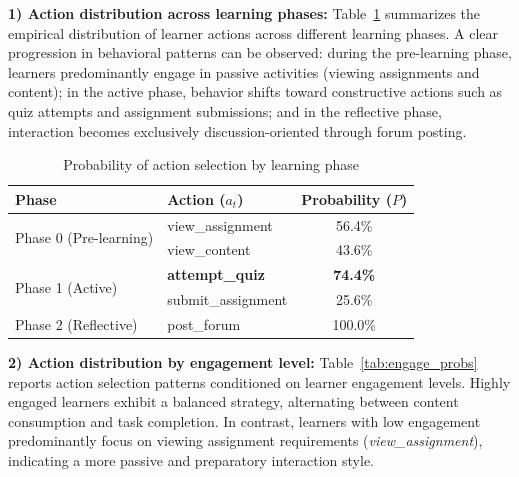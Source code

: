 \documentclass[conference]{IEEEtran}
\begin{document}
\textbf{1) Action distribution across learning phases:}
Table~\ref{tab:phase_probs} summarizes the empirical distribution of learner actions across different learning phases. A clear progression in behavioral patterns can be observed: during the pre-learning phase, learners predominantly engage in passive activities (viewing assignments and content); in the active phase, behavior shifts toward constructive actions such as quiz attempts and assignment submissions; and in the reflective phase, interaction becomes exclusively discussion-oriented through forum posting.

\begin{table}[t]
\caption{Probability of action selection by learning phase}
\label{tab:phase_probs}
\begin{center}
\begin{tabular}{llc}
\toprule
\textbf{Phase} & \textbf{Action ($a_t$)} & \textbf{Probability ($P$)} \\
\midrule
\multirow{2}{*}{Phase 0 (Pre-learning)} & view\_assignment & 56.4\% \\ 
& view\_content & 43.6\% \\
\midrule
\multirow{2}{*}{Phase 1 (Active)} & \textbf{attempt\_quiz} & \textbf{74.4\%} \\ 
& submit\_assignment & 25.6\% \\
\midrule
Phase 2 (Reflective) & post\_forum & 100.0\% \\
\bottomrule
\end{tabular}
\end{center}
\end{table}

\textbf{2) Action distribution by engagement level:}
Table~\ref{tab:engage_probs} reports action selection patterns conditioned on learner engagement levels. Highly engaged learners exhibit a balanced strategy, alternating between content consumption and task completion. In contrast, learners with low engagement predominantly focus on viewing assignment requirements (\textit{view\_assignment}), indicating a more passive and preparatory interaction style.

\begin{table}[t]
\caption{Action probability distribution by engagement level}
\label{tab:engage_probs}
\begin{center}
\end{center}
\end{table}
\end{document}
